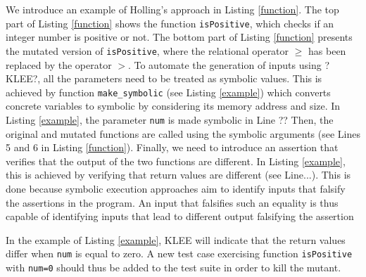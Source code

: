 We introduce an example of Holling's approach in Listing \ref{function}. The top part of Listing \ref{function} shows the function \texttt{isPositive}, which checks if an integer number is positive or not. The bottom part of Listing \ref{function} presents the mutated version of \texttt{isPositive}, 
where the relational operator $\geq$ has been replaced by the operator $>$.
To automate the generation of inputs using ?KLEE?, all the parameters need to be treated as symbolic values.
This is achieved by function \texttt{make\_symbolic} (see Listing \ref{example}) which converts concrete variables to symbolic by considering its memory address and size. 
In  Listing \ref{example}, the parameter \texttt{num} is made symbolic in Line ??
Then, the original and mutated functions are called using the symbolic arguments (see Lines 5 and 6 in Listing \ref{function}). 
Finally, we need to introduce an assertion that verifies that the output of the two functions are different. 
In Listing \ref{example}, this is achieved by verifying that return values are different (see Line...). 
This is done because symbolic execution approaches aim to identify inputs that falsify the assertions in the program. 
An input that falsifies such an equality is thus capable of identifying inputs that lead to different output  falsifying the assertion

In the example of Listing \ref{example},
KLEE will indicate that the return values differ when \texttt{num} is equal to zero.
A new test case exercising function \texttt{isPositive} with \texttt{num=0} should thus be added to the test suite in order to kill the mutant.

